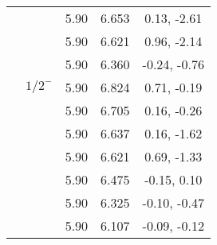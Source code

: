 \documentclass[prd,twocolumn,floatfix,nofootinbib]{revtex4}
\begin{document}
\begin{table*}[!htbp]
\begin{tabular}{ccccc}
            &               &5.90   &6.653  &0.13, -2.61 \\
            &               &5.90   &6.621  &0.96, -2.14 \\
            &               &5.90   &6.360  &-0.24, -0.76 \\
            &${1/2}^{-}$    &5.90   &6.824  &0.71, -0.19 \\
            &               &5.90   &6.705  &0.16, -0.26 \\
            &               &5.90   &6.637  &0.16, -1.62 \\
            &               &5.90   &6.621  &0.69, -1.33 \\
            &               &5.90   &6.475  &-0.15, 0.10 \\
            &               &5.90   &6.325  &-0.10, -0.47 \\
            &               &5.90   &6.107  &-0.09, -0.12 \\
        \hline\hline
    \end{tabular}
\end{table*}
\end{document}
